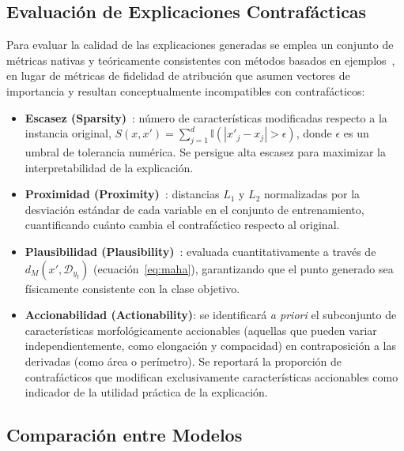 \documentclass[conference]{IEEEtran}
\begin{document}
\subsection{Evaluación de Explicaciones Contrafácticas}

Para evaluar la calidad de las explicaciones generadas se emplea un
conjunto de métricas nativas y teóricamente consistentes con métodos
basados en ejemplos~\cite{b8,b9,b10}, en lugar de métricas de fidelidad
de atribución que asumen vectores de importancia y resultan
conceptualmente incompatibles con contrafácticos:

\begin{itemize}
    \item[$\bullet$] \textbf{Escasez (Sparsity)}~\cite{b8}: número de
    características modificadas respecto a la instancia original,
    $S(x, x') = \sum_{j=1}^d \mathbb{I}(|x'_j - x_j| > \epsilon)$,
    donde $\epsilon$ es un umbral de tolerancia numérica. Se persigue
    alta escasez para maximizar la interpretabilidad de la explicación.

    \item[$\bullet$] \textbf{Proximidad (Proximity)}~\cite{b4,b9}:
    distancias $L_1$ y $L_2$ normalizadas por la desviación estándar de
    cada variable en el conjunto de entrenamiento, cuantificando cuánto
    cambia el contrafáctico respecto al original.

    \item[$\bullet$] \textbf{Plausibilidad (Plausibility)}~\cite{b10}:
    evaluada cuantitativamente a través de $d_M(x', \mathcal{D}_{y_t})$
    (ecuación~\eqref{eq:maha}), garantizando que el punto generado sea
    físicamente consistente con la clase objetivo.

    \item[$\bullet$] \textbf{Accionabilidad (Actionability)}: se
    identificará \emph{a priori} el subconjunto de características
    morfológicamente accionables (aquellas que pueden variar
    independientemente, como elongación y compacidad) en contraposición
    a las derivadas (como área o perímetro). Se reportará la proporción
    de contrafácticos que modifican exclusivamente características
    accionables como indicador de la utilidad práctica de la explicación.
\end{itemize}

\subsection{Comparación entre Modelos}
\end{document}
